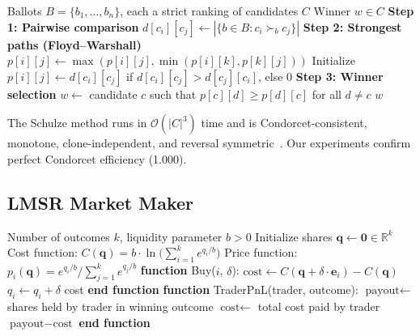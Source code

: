 \documentclass[10pt]{article}
\begin{document}
\begin{algorithm}[H]
\caption{Schulze Beatpath Method}
\label{alg:schulze}
\begin{algorithmic}[1]
\REQUIRE Ballots $B = \{b_1, \ldots, b_n\}$, each a strict ranking of candidates $C$
\ENSURE Winner $w \in C$
\STATE \textbf{Step 1: Pairwise comparison}
  \STATE $d[c_i][c_j] \leftarrow |\{b \in B : c_i \succ_b c_j\}|$
\ENDFOR
\STATE \textbf{Step 2: Strongest paths (Floyd--Warshall)}
      \STATE $p[i][j] \leftarrow \max(p[i][j], \min(p[i][k], p[k][j]))$
    \ENDFOR
  \ENDFOR
\ENDFOR
\STATE Initialize $p[i][j] \leftarrow d[c_i][c_j]$ if $d[c_i][c_j] > d[c_j][c_i]$, else $0$
\STATE \textbf{Step 3: Winner selection}
\STATE $w \leftarrow$ candidate $c$ such that $p[c][d] \geq p[d][c]$ for all $d \neq c$
\RETURN $w$
\end{algorithmic}
\end{algorithm}

The Schulze method runs in $\mathcal{O}(|C|^3)$ time and is Condorcet-consistent, monotone, clone-independent, and reversal symmetric~\citep{schulze2011new}. Our experiments confirm perfect Condorcet efficiency (1.000).

\subsection{LMSR Market Maker}
\label{app:lmsr}

\begin{algorithm}[H]
\caption{Logarithmic Market Scoring Rule (LMSR)}
\label{alg:lmsr}
\begin{algorithmic}[1]
\REQUIRE Number of outcomes $k$, liquidity parameter $b > 0$
\STATE Initialize shares $\mathbf{q} \leftarrow \mathbf{0} \in \mathbb{R}^k$
\STATE Cost function: $C(\mathbf{q}) = b \cdot \ln\!\bigl(\sum_{i=1}^{k} e^{q_i/b}\bigr)$
\STATE Price function: $p_i(\mathbf{q}) = e^{q_i/b} / \sum_{j=1}^{k} e^{q_j/b}$
\STATE \textbf{function} Buy($i$, $\delta$):
  \STATE \quad $\text{cost} \leftarrow C(\mathbf{q} + \delta \cdot \mathbf{e}_i) - C(\mathbf{q})$
  \STATE \quad $q_i \leftarrow q_i + \delta$
  \STATE \quad \RETURN cost
\STATE \textbf{end function}
\STATE \textbf{function} TraderPnL($\text{trader}$, $\text{outcome}$):
  \STATE \quad $\text{payout} \leftarrow$ shares held by trader in winning outcome
  \STATE \quad $\text{cost} \leftarrow$ total cost paid by trader
  \STATE \quad \RETURN $\text{payout} - \text{cost}$
\STATE \textbf{end function}
\end{algorithmic}
\end{algorithm}
\end{document}
